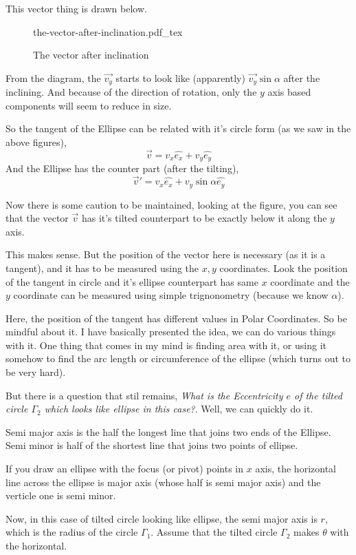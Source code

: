 \documentclass[11pt,a4paper]{article}
\newcommand{\incfig}[1]{%
    \def\svgwidth{0.7\columnwidth}
    {#1.pdf_tex}
}
\begin{document}
This vector thing is drawn below.
\begin{figure}[ht!]
    \centering
    \incfig{the-vector-after-inclination}
    \caption{The vector after inclination}
    \label{fig:the-vector-after-inclination}
\end{figure}
From the diagram, the $\vec{v_y}$ starts to look like (apparently) $\vec{v_y} \sin \alpha$ after the inclining. And because of the direction of rotation, only the $y$ axis based components will seem to reduce in size. 

So the tangent of the Ellipse can be related with it's circle form (as we saw in the above figures),
\[ 
\vec{v} = v_x \hat{e_x} + v_y \hat{e_y}
\]
And the Ellipse has the counter part (after the tilting),
\[ 
\vec{v}' = v_x \hat{e_x} + v_y \sin \alpha \hat{ e_y}
\]

Now there is some caution to be maintained, looking at the figure, you can see that the vector $\vec{v}$ has it's tilted counterpart  to be exactly below it  along the $y$ axis. 

This makes sense. But the position of the vector here is necessary (as it is a tangent), and it has to be measured using the $x,y$ coordinates. Look the position of the tangent in circle and it's ellipse counterpart has same $x$ coordinate and the $y$ coordinate can be measured using simple trignonometry (because we know $\alpha$). 

Here, the position of the tangent has different values in Polar Coordinates. So be mindful about it. I have basically presented the idea, we can do various things with it. One thing that comes in my mind is finding area with it, or using it somehow to find the arc length or circumference of the ellipse (which turns out to be very hard). 

But there is a question that stil remains, \emph{What is the Eccentricity $e$ of the tilted circle $\Gamma_2$ which looks like ellipse in this case?}. Well, we can quickly do it.

Semi major axis is the half the longest line that joins two ends of the Ellipse. Semi minor is half of the shortest line that joins two points of ellipse.

If you draw an ellipse with the focus (or pivot) points in $x$ axis, the horizontal line across the ellipse is major axis (whose half is semi major axis) and the verticle one is semi minor. 

Now, in this case of tilted circle looking like ellipse, the semi major axis is $r$, which is the radius of the circle $\Gamma_1$. Assume that the tilted circle $\Gamma_2$ makes $\theta$ with the horizontal. 
\end{document}
